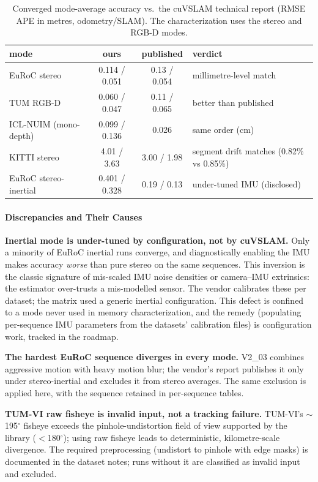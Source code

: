 \begin{table}[t]
\centering
\caption{Converged mode-average accuracy vs.\ the cuVSLAM technical report (RMSE APE in metres, odometry/SLAM). The characterization uses the stereo and RGB-D modes.}
\label{tab:accuracy}
\begin{tabular}{@{}lccl@{}}
\toprule
mode & ours & published & verdict \\
\midrule
EuRoC stereo & 0.114 / 0.051 & 0.13 / 0.054 & millimetre-level match \\
TUM RGB-D & 0.060 / 0.047 & 0.11 / 0.065 & better than published \\
ICL-NUIM (mono-depth) & 0.099 / 0.136 & 0.026 & same order (cm) \\
KITTI stereo & 4.01 / 3.63 & 3.00 / 1.98 & segment drift matches (0.82\% vs 0.85\%) \\
EuRoC stereo-inertial & 0.401 / 0.328 & 0.19 / 0.13 & under-tuned IMU (disclosed) \\
\bottomrule
\end{tabular}
\end{table}

\paragraph{Discrepancies and Their Causes}
\label{sec:val-discrepancies}

\textbf{Inertial mode is under-tuned by configuration, not by cuVSLAM.} Only a minority of EuRoC inertial runs converge, and diagnostically enabling the IMU makes accuracy \emph{worse} than pure stereo on the same sequences. This inversion is the classic signature of mis-scaled IMU noise densities or camera--IMU extrinsics: the estimator over-trusts a mis-modelled sensor. The vendor calibrates these per dataset; the matrix used a generic inertial configuration. This defect is confined to a mode never used in memory characterization, and the remedy (populating per-sequence IMU parameters from the datasets' calibration files) is configuration work, tracked in the roadmap.

\textbf{The hardest EuRoC sequence diverges in every mode.} V2\_03 combines aggressive motion with heavy motion blur; the vendor's report publishes it only under stereo-inertial and excludes it from stereo averages. The same exclusion is applied here, with the sequence retained in per-sequence tables.

\textbf{TUM-VI raw fisheye is invalid input, not a tracking failure.} TUM-VI's $\sim$195$^\circ$ fisheye exceeds the pinhole-undistortion field of view supported by the library ($<$180$^\circ$); using raw fisheye leads to deterministic, kilometre-scale divergence. The required preprocessing (undistort to pinhole with edge masks) is documented in the dataset notes; runs without it are classified as invalid input and excluded.

